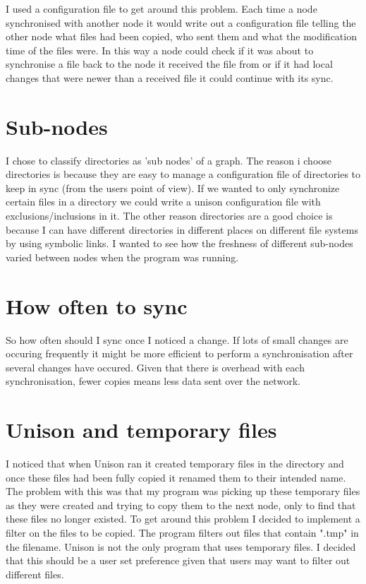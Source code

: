 \documentclass[12pt]{article}
\begin{document}
I used a configuration file to get around this problem. Each time a node
synchronised with another node it would write out a configuration file telling
the other node what files had been copied, who sent them and what the
modification time of the files were. In this way a node could check
if it was about to synchronise a file back to the node it received
the file from or if it had local changes that were newer than a received
file it could continue with its sync.

\section{Sub-nodes}
I chose to classify directories as 'sub nodes' of a graph. The reason i choose
directories is because they are easy to manage a configuration file of directories to
keep in sync (from the users point of view). If we wanted to only synchronize
certain files in a directory we could write a unison configuration file with 
exclusions/inclusions in it. The other reason directories are a good choice
is because I can have different directories in different places on different
file systems by using symbolic links. I wanted to see how the freshness of different
sub-nodes varied between nodes when the program was running.

\section{How often to sync}
So how often should I sync once I noticed a change.
If lots of small changes are occuring frequently it might be more efficient
to perform a synchronisation after several changes have occured. Given that
there is overhead with each synchronisation, fewer copies means less data
sent over the network.

\section{Unison and temporary files}
I noticed that when Unison ran it created temporary files in the
directory and once these files had been fully copied it renamed
them to their intended name. The problem with this was that my program
was picking up these temporary files as they were created and trying to
copy them to the next node, only to find that these files no longer existed.
To get around this problem I decided to implement a filter on the files to
be copied. The program filters out files that contain ".tmp" in the filename.
Unison is not the only program that uses temporary files. I decided that this
should be a user set preference given that users may want to filter out different
files.
\end{document}
